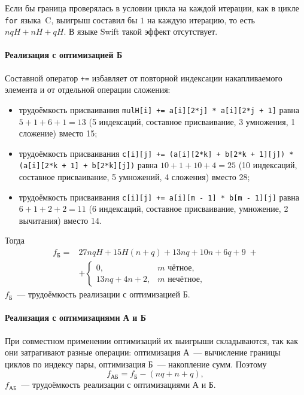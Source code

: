Если бы граница проверялась в условии цикла на каждой итерации, как в цикле \texttt{for} языка~C, выигрыш составил бы $1$ на каждую итерацию, то есть $nqH + nH + qH$. В языке Swift такой эффект отсутствует.

\paragraph{Реализация с оптимизацией Б}
Составной оператор \texttt{+=} избавляет от повторной индексации накапливаемого элемента и от отдельной операции сложения:
\begin{itemize}
	\item трудоёмкость присваивания \texttt{mulH[i] += a[i][2*j] * a[i][2*j + 1]} равна $5 + 1 + 6 + 1 = 13$ (5 индексаций, составное присваивание, 3 умножения, 1 сложение) вместо 15;
	\item трудоёмкость присваивания \texttt{c[i][j] += (a[i][2*k] + b[2*k + 1][j]) * (a[i][2*k + 1] + b[2*k][j])} равна $10 + 1 + 10 + 4 = 25$ (10 индексаций, составное присваивание, 5 умножений, 4 сложения) вместо 28;
	\item трудоёмкость присваивания \texttt{c[i][j] += a[i][m - 1] * b[m - 1][j]} равна $6 + 1 + 2 + 2 = 11$ (6 индексаций, составное присваивание, умножение, 2 вычитания) вместо 14.
\end{itemize}
Тогда
\begin{equation}
	\label{eq:f-add}
	\begin{split}
	f_{\text{Б}} = {} & 27nqH + 15H(n + q) + 13nq + 10n + 6q + 9 \; + \\
	& + \begin{cases}
		0, & m \text{ чётное}, \\
		13nq + 4n + 2, & m \text{ нечётное},
	\end{cases}
	\end{split}
\end{equation}
\where{} $f_{\text{Б}}$~--- трудоёмкость реализации с оптимизацией Б.

\paragraph{Реализация с оптимизациями А и Б}
При совместном применении оптимизаций их выигрыши складываются, так как они затрагивают разные операции: оптимизация А~--- вычисление границы циклов по индексу пары, оптимизация Б~--- накопление сумм. Поэтому
\begin{equation}
	\label{eq:f-shift-add}
	f_{\text{АБ}} = f_{\text{Б}} - (nq + n + q),
\end{equation}
\where{} $f_{\text{АБ}}$~--- трудоёмкость реализации с оптимизациями А и Б.

